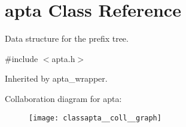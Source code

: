\hypertarget{classapta}{}\section{apta Class Reference}
\label{classapta}


Data structure for the prefix tree.  




{\ttfamily \#include $<$apta.\+h$>$}



Inherited by apta\+\_\+wrapper.



Collaboration diagram for apta\+:
\nopagebreak
\begin{figure}[H]
\begin{center}
\leavevmode
\texttt{[image: classapta\_\_coll\_\_graph]}
\end{center}
\end{figure}
